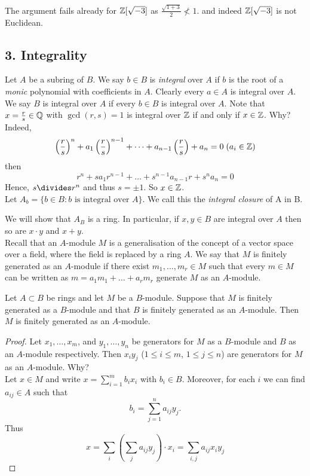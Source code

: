 \documentclass[NumTh.tex]{subfiles}
\begin{document}
The argument fails already for $\mathbb{Z}[\sqrt{-3}]$ as $\frac{\sqrt{1 + 3}}{2} \nless 1$.
and indeed $\mathbb{Z}[\sqrt{-3}]$ is not Euclidean.

\subsection{3. Integrality}

Let $A$ be a subring of $B$.
We say $b \in B$ is \emph{integral} over $A$ if $b$ is the root of a \emph{monic} polynomial with coefficients in $A$.
Clearly every $a \in A$ is integral over $A$.
We say $B$ is integral over $A$ if every $b \in B$ is integral over $A$.
Note that $x = \frac{r}{s} \in \mathbb{Q}$ with $\gcd(r,s) = 1$ is integral over $\mathbb{Z}$ if and only if $x \in \mathbb{Z}$. Why?
Indeed, 
\[ \left( \frac{r}{s} \right)^n + a_1 \left( \frac{r}{s} \right)^{n-1} + \dots + a_{n-1} \left( \frac{r}{s} \right) + a_n = 0 \; (a_i \in \mathbb{Z})\]
then 
\[ r^n + s a_1 r^{n-1} + \dots + s^{n-1} a_{n-1} r + s^n a_n = 0\]
Hence, $s \divides r^n$ and thus $s = \pm 1$.
So $x \in \mathbb{Z}$.
\\

Let $A_b = \{ b \in B : b \text{ is integral over } A\}$.
We call this the \emph{integral closure} of A in B.

We will show that $A_B$ is a ring.
In particular, if $x,y \in B$ are integral over $A$ then so are $x \cdot y$ and $x + y$.
\\

Recall that an $A$-module $M$ is a generalisation of the concept of a vector space over a field, where the field is replaced by a ring $A$.
We say that $M$ is finitely generated as an $A$-module if there exist $m_1,\dots,m_r \in M$ such that every $m \in M$ can be written as $m = a_1 m_1 + \dots + a_r m_r$ generate $M$ as an $A$-module.

\begin{lemma}[3.3.1\label{l_3_3_1}]
  Let $A \subset B$ be rings and let $M$ be a $B$-module.
  Suppose that $M$ is finitely generated as a $B$-module and that $B$ is finitely generated as an $A$-module.
  Then $M$ is finitely generated as an $A$-module.
\end{lemma}

\begin{proof}
  Let $x_1,\dots,x_m$, and $y_1,\dots,y_n$ be generators for $M$ as a $B$-module and $B$ as an $A$-module respectively.
  Then $x_i y_j$ ($1 \leq i \leq m$, $1 \leq j \leq n$) are generators for $M$ as an $A$-module. Why?\\
  Let $x \in M$ and write $x = \sum_{i=1}^m b_i x_i$ with $b_i \in B$.
  Moreover, for each $i$ we can find $a_{ij} \in A$ such that
  \[ b_i = \sum_{j=1}^n a_{ij} y_j \text{.} \]
  Thus
  \[ x = \sum_i \left( \sum_j a_{ij} y_j \right) \cdot x_i = \sum_{i,j} a_{ij}x_i y_j\]
\end{proof}
\end{document}
